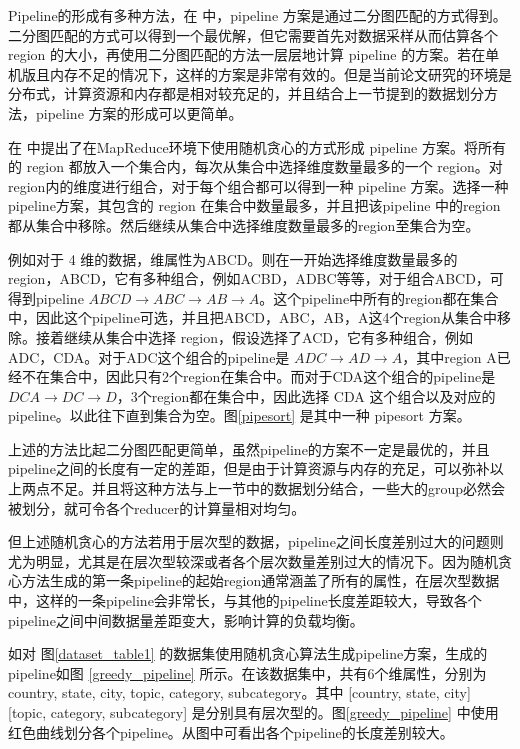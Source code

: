 Pipeline的形成有多种方法，在 \cite{agarwal1996computation} 中，pipeline 方案是通过二分图匹配的方式得到。二分图匹配的方式可以得到一个最优解，但它需要首先对数据采样从而估算各个 region 的大小，再使用二分图匹配的方法一层层地计算 pipeline 的方案。若在单机版且内存不足的情况下，这样的方案是非常有效的。但是当前论文研究的环境是分布式，计算资源和内存都是相对较充足的，并且结合上一节提到的数据划分方法，pipeline 方案的形成可以更简单。

在\cite{wang2013scalable} 中提出了在MapReduce环境下使用随机贪心的方式形成 pipeline 方案。将所有的 region 都放入一个集合内，每次从集合中选择维度数量最多的一个 region。对region内的维度进行组合，对于每个组合都可以得到一种 pipeline 方案。选择一种pipeline方案，其包含的 region 在集合中数量最多，并且把该pipeline 中的region都从集合中移除。然后继续从集合中选择维度数量最多的region至集合为空。

例如对于 4 维的数据，维属性为ABCD。则在一开始选择维度数量最多的 region，ABCD，它有多种组合，例如ACBD，ADBC等等，对于组合ABCD，可得到pipeline $ABCD\rightarrow ABC\rightarrow AB\rightarrow A$。这个pipeline中所有的region都在集合中，因此这个pipeline可选，并且把ABCD，ABC，AB，A这4个region从集合中移除。接着继续从集合中选择 region，假设选择了ACD，它有多种组合，例如ADC，CDA。对于ADC这个组合的pipeline是  $ADC\rightarrow AD\rightarrow A$，其中region A已经不在集合中，因此只有2个region在集合中。而对于CDA这个组合的pipeline是  $DCA\rightarrow DC\rightarrow D$，3个region都在集合中，因此选择 CDA 这个组合以及对应的pipeline。以此往下直到集合为空。图\ref{pipesort} 是其中一种 pipesort 方案。

上述的方法比起二分图匹配更简单，虽然pipeline的方案不一定是最优的，并且pipeline之间的长度有一定的差距，但是由于计算资源与内存的充足，可以弥补以上两点不足。并且将这种方法与上一节中的数据划分结合，一些大的group必然会被划分，就可令各个reducer的计算量相对均匀。

但上述随机贪心的方法若用于层次型的数据，pipeline之间长度差别过大的问题则尤为明显，尤其是在层次型较深或者各个层次数量差别过大的情况下。因为随机贪心方法生成的第一条pipeline的起始region通常涵盖了所有的属性，在层次型数据中，这样的一条pipeline会非常长，与其他的pipeline长度差距较大，导致各个pipeline之间中间数据量差距变大，影响计算的负载均衡。

如对 图\ref{dataset_table1} 的数据集使用随机贪心算法生成pipeline方案，生成的pipeline如图 \ref{greedy_pipeline} 所示。在该数据集中，共有6个维属性，分别为 country, state, city, topic, category, subcategory。其中 [country, state, city] [topic, category, subcategory] 是分别具有层次型的。图\ref{greedy_pipeline} 中使用红色曲线划分各个pipeline。从图中可看出各个pipeline的长度差别较大。

